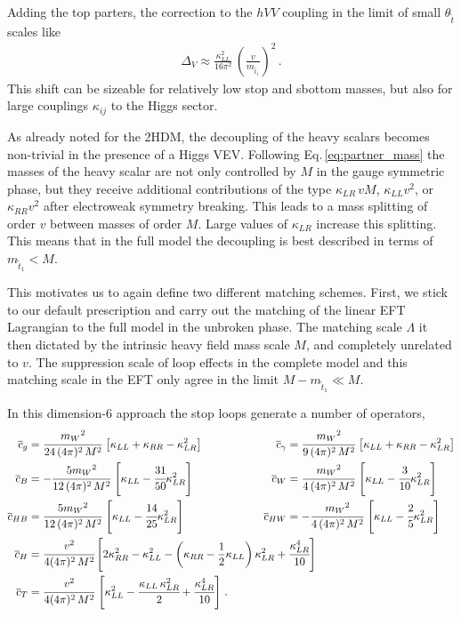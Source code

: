 Adding the top parters, the correction to the $hVV$ coupling in the
limit of small $\theta_{\tilde{t}}$ scales like
%
\begin{align} \Delta_V \approx \frac{\kappa_{LL}^2}{16 \pi^2} \,
\left( \frac{v}{m_{\tilde{t}_{1}}} \right)^2 \,.
\label{eq:partner_decoup}
\end{align}
%
This shift can be sizeable for relatively low stop and sbottom masses,
but also for large couplings $\kappa_{ij}$ to the Higgs sector.

As already noted for the 2HDM, the decoupling of the heavy scalars
becomes non-trivial in the presence of a Higgs VEV. Following
Eq.\,\eqref{eq:partner_mass} the masses of the heavy scalar are not
only controlled by $M$ in the gauge symmetric phase, but they receive
additional contributions of the type $\kappa_{LR} \, vM$, $\kappa_{LL}
v^2$, or $\kappa_{RR} v^2$ after electroweak symmetry breaking. This
leads to a mass splitting of order $v$ between masses of order
$M$. Large values of $\kappa_{LR}$ increase this splitting. This means
that in the full model the decoupling is best described in terms of
$m_{\tilde{t}_{1}} < M$.\medskip

This motivates us to again define two different matching
schemes. First, we stick to our default prescription and carry out the
matching of the linear EFT Lagrangian to the full model in the
unbroken phase. The matching scale $\Lambda$ it then dictated by the
intrinsic heavy field mass scale $M$, and completely unrelated to
$v$. The suppression scale of loop effects in the complete model and
this matching scale in the EFT only agree in the limit $M -
m_{\tilde{t}_{1}} \ll M$.

In this dimension-6 approach the stop loops generate a number of
operators,
%
\begin{align} \overline{c}_{g} &=
\cfrac{{m_W}^2}{24\,(4\pi)^2\,M^2}\,\left[ \kappa_{LL} + \kappa_{RR} -
\kappa_{LR}^2\right] &\overline{c}_{\gamma} &=
\cfrac{{m_W}^2}{9\,(4\pi)^2\,M^2}\,\left[ \kappa_{LL} + \kappa_{RR} -
\kappa_{LR}^2\right] \notag \\ \overline{c}_{B} &=
-\cfrac{5{m_W}^2}{12\,(4\pi)^2\,M^2}\,\left[\kappa_{LL} -
\cfrac{31}{50} \kappa_{LR}^2 \right] &\overline{c}_{W} &=
\cfrac{{m_W}^2}{4\,(4\pi)^2\,M^2}\,\left[\kappa_{LL} - \cfrac{3}{10}
\kappa_{LR}^2 \right] \notag \\ \overline{c}_{HB} &=
\cfrac{5{m_W}^2}{12\,(4\pi)^2\,M^2}\,\left[\kappa_{LL} -
\cfrac{14}{25} \kappa_{LR}^2 \right] &\overline{c}_{HW} &= -
\cfrac{{m_W}^2}{4\,(4\pi)^2\,M^2}\,\left[\kappa_{LL} - \cfrac{2}{5}
\kappa_{LR}^2 \right] \notag \\ \overline{c}_H &=
\cfrac{v^2}{4(4\pi)^2\,M^2}\,\Bigg[ 2\kappa_{RR}^2-\kappa_{LL}^2 -
\left( \kappa_{RR} - \frac{1}{2}\kappa_{LL} \right) \kappa_{LR}^2 +
\cfrac{\kappa_{LR}^4}{10} \Bigg] \hspace*{-2cm}&& \notag \\
\overline{c}_T &= \cfrac{v^2}{4(4\pi)^2\,M^2}\,\left[\kappa_{LL}^2 -
\cfrac{\kappa_{LL}\,\kappa_{LR}^2}{2} +
\cfrac{\kappa_{LR}^4}{10}\right] \,.
 \label{eq:c-ew}
\end{align}

